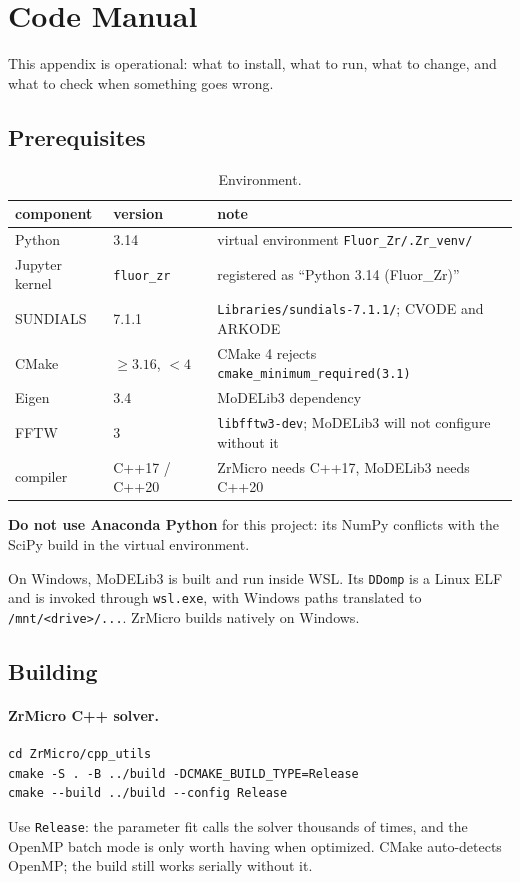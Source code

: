 \documentclass[11pt]{article}
\newcommand{\ZrM}{\textsf{ZrMicro}}
\newcommand{\MoD}{\textsf{MoDELib3}}
\newcommand{\code}[1]{\texttt{\small #1}}
\newcommand{\file}[1]{\texttt{\footnotesize #1}}
\begin{document}
\section{Code Manual}
\label{sec:manual}

This appendix is operational: what to install, what to run, what to change, and
what to check when something goes wrong.

\subsection{Prerequisites}

\begin{table}[htbp]
\centering
\caption{Environment.}
\label{tab:env}
\begin{tabular}{@{}lll@{}}
\toprule
component & version & note \\
\midrule
Python & 3.14 & virtual environment \file{Fluor\_Zr/.Zr\_venv/} \\
Jupyter kernel & \code{fluor\_zr} & registered as ``Python 3.14 (Fluor\_Zr)'' \\
SUNDIALS & 7.1.1 & \file{Libraries/sundials-7.1.1/}; CVODE and ARKODE \\
CMake & $\ge 3.16$, $< 4$ & CMake 4 rejects \code{cmake\_minimum\_required(3.1)} \\
Eigen & 3.4 & \MoD{} dependency \\
FFTW & 3 & \code{libfftw3-dev}; \MoD{} will not configure without it \\
compiler & C++17 / C++20 & \ZrM{} needs C++17, \MoD{} needs C++20 \\
\bottomrule
\end{tabular}
\end{table}

\noindent
\textbf{Do not use Anaconda Python} for this project: its NumPy conflicts with
the SciPy build in the virtual environment.

On Windows, \MoD{} is built and run inside WSL. Its \code{DDomp} is a Linux ELF
and is invoked through \code{wsl.exe}, with Windows paths translated to
\file{/mnt/<drive>/...}. \ZrM{} builds natively on Windows.

\subsection{Building}

\paragraph*{\ZrM{} C++ solver.}
\begin{lstlisting}
cd ZrMicro/cpp_utils
cmake -S . -B ../build -DCMAKE_BUILD_TYPE=Release
cmake --build ../build --config Release
\end{lstlisting}
Use \code{Release}: the parameter fit calls the solver thousands of times, and
the OpenMP batch mode is only worth having when optimized. CMake auto-detects
OpenMP; the build still works serially without it.
\end{document}
